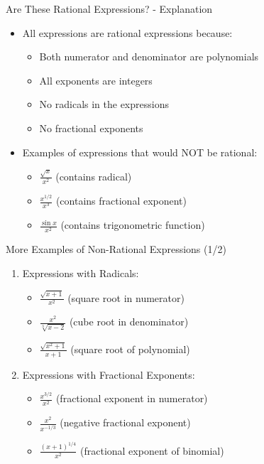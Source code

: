 \documentclass[aspectratio=169]{beamer}
\begin{document}
\begin{frame}{Are These Rational Expressions? - Explanation}
\begin{tcolorbox}[colback=lightgray,colframe=primary,title=Key Points]
\footnotesize
\begin{itemize}
  \item All expressions are rational expressions because:
  \begin{itemize}
    \item Both numerator and denominator are polynomials
    \item All exponents are integers
    \item No radicals in the expressions
    \item No fractional exponents
  \end{itemize}
  \item Examples of expressions that would NOT be rational:
  \begin{itemize}
    \item $\frac{\sqrt{x}}{x^2}$ (contains radical)
    \item $\frac{x^{1/2}}{x^3}$ (contains fractional exponent)
    \item $\frac{\sin x}{x^2}$ (contains trigonometric function)
  \end{itemize}
\end{itemize}
\end{tcolorbox}
\end{frame}


\begin{frame}{More Examples of Non-Rational Expressions (1/2)}
\begin{tcolorbox}[colback=lightgray,colframe=accent,title=Examples: Radicals & Fractional Exponents]
\footnotesize
\begin{enumerate}
  \item Expressions with Radicals:
  \begin{itemize}
    \item $\frac{\sqrt{x+1}}{x^2}$ (square root in numerator)
    \item $\frac{x^2}{\sqrt[3]{x-2}}$ (cube root in denominator)
    \item $\frac{\sqrt{x^2+1}}{x+1}$ (square root of polynomial)
  \end{itemize}

  \item Expressions with Fractional Exponents:
  \begin{itemize}
    \item $\frac{x^{3/2}}{x^2}$ (fractional exponent in numerator)
    \item $\frac{x^2}{x^{-1/3}}$ (negative fractional exponent)
    \item $\frac{(x+1)^{1/4}}{x^2}$ (fractional exponent of binomial)
  \end{itemize}
\end{enumerate}
\end{tcolorbox}
\end{frame}
\end{document}
